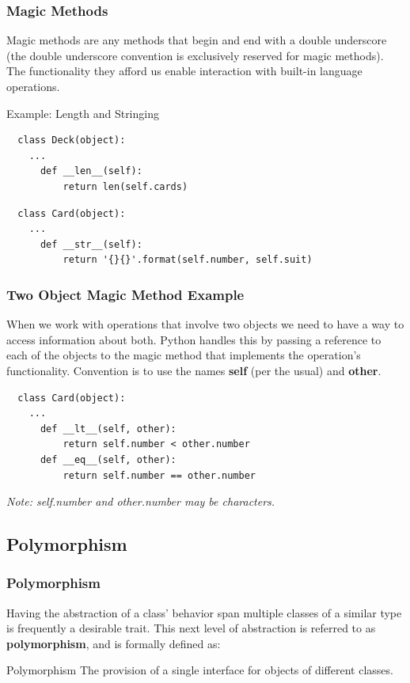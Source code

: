 \documentclass{beamer}
\begin{document}
\begin{frame}[fragile]
  \frametitle{Magic Methods}
  Magic methods are any methods that begin and end with a double underscore (the double underscore convention is exclusively reserved for magic methods). The functionality they afford us enable interaction with built-in language operations. \vspace{5mm}
  
  {\large Example: Length and Stringing}

  \begin{lstlisting}
  class Deck(object):
    ...
      def __len__(self):
          return len(self.cards)
  \end{lstlisting}
  \pause
  \begin{lstlisting}
  class Card(object):
    ...
      def __str__(self):
          return '{}{}'.format(self.number, self.suit)
  \end{lstlisting}
\end{frame}

\begin{frame}[fragile]
  \frametitle{Two Object Magic Method Example}
  When we work with operations that involve two objects we need to have a way to access information about both. Python handles this by passing a reference to each of the objects to the magic method that implements the operation's functionality. Convention is to use the names \textbf{self} (per the usual) and \textbf{other}. \vspace{2mm}
  \pause

  \begin{lstlisting}
  class Card(object):
    ...
      def __lt__(self, other):
          return self.number < other.number
      def __eq__(self, other):
          return self.number == other.number
  \end{lstlisting}
  \textit{Note: self.number and other.number may be characters.} \vspace{2mm}
\end{frame}

\subsection{Polymorphism}
\begin{frame}
  \frametitle{Polymorphism}
  Having the abstraction of a class' behavior span multiple classes of a similar type is frequently a desirable trait. This next level of abstraction is referred to as \textbf{polymorphism}, and is formally defined as: \vspace{5mm}

  \begin{block}{Polymorphism}
    The provision of a single interface for objects of different classes.
  \end{block}
\end{frame}
\end{document}
